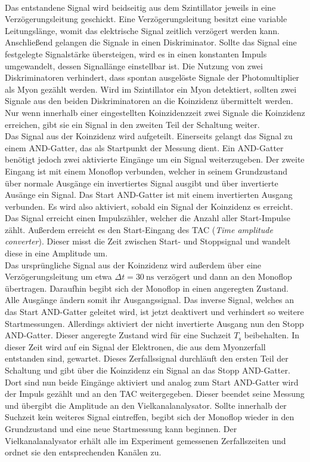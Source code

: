 \\
Das entstandene Signal wird beidseitig aus dem Szintillator jeweils in eine Verzögerungsleitung geschickt.
Eine Verzögerungsleitung besitzt eine variable Leitungslänge, womit das elektrische Signal zeitlich verzögert werden kann.
Anschließend gelangen die Signale in einen Diskriminator.
Sollte das Signal eine festgelegte Signalstärke übersteigen, wird es in einen konstanten Impuls umgewandelt, dessen Signallänge einstellbar ist.
Die Nutzung von zwei Diskriminatoren verhindert, dass spontan ausgelöste Signale der Photomultiplier als Myon gezählt werden.
Wird im Szintillator ein Myon detektiert, sollten zwei Signale aus den beiden Diskriminatoren an die Koinzidenz übermittelt werden.
Nur wenn innerhalb einer eingestellten Koinzidenzzeit zwei Signale die Koinzidenz erreichen, gibt sie ein Signal in den zweiten Teil der Schaltung weiter.
\\
Das Signal aus der Koinzidenz wird aufgeteilt.
Einerseits gelangt das Signal zu einem AND-Gatter, das als Startpunkt der Messung dient.
Ein AND-Gatter benötigt jedoch zwei aktivierte Eingänge um ein Signal weiterzugeben.
Der zweite Eingang ist mit einem Monoflop verbunden, welcher in seinem Grundzustand über normale Ausgänge ein invertiertes Signal ausgibt und über invertierte Ausänge ein Signal.
Das Start AND-Gatter ist mit einem invertierten Ausgang verbunden.
Es wird also aktiviert, sobald ein Signal der Koinzidenz es erreicht.
Das Signal erreicht einen Impulszähler, welcher die Anzahl aller Start-Impulse zählt.
Außerdem erreicht es den Start-Eingang des TAC (\textit{Time amplitude converter}).
Dieser misst die Zeit zwischen Start- und Stoppsignal und wandelt diese in eine Amplitude um.
\\
Das ursprüngliche Signal aus der Koinzidenz wird außerdem über eine Verzögerungsleitung um etwa $\Delta t = \qty{30}{\nano\second}$ verzögert und dann an den Monoflop übertragen.
Daraufhin begibt sich der Monoflop in einen angeregten Zustand. 
Alle Ausgänge ändern somit ihr Ausgangssignal.
Das inverse Signal, welches an das Start AND-Gatter geleitet wird, ist jetzt deaktivert und verhindert so weitere Startmessungen.
Allerdings aktiviert der nicht invertierte Ausgang nun den Stopp AND-Gatter.
Dieser angeregte Zustand wird für eine Suchzeit $T_\text{s}$ beibehalten. 
In dieser Zeit wird auf ein Signal der Elektronen, die aus dem Myonzerfall entstanden sind, gewartet.
Dieses Zerfallssignal durchläuft den ersten Teil der Schaltung und gibt über die Koinzidenz ein Signal an das Stopp AND-Gatter.
Dort sind nun beide Eingänge aktiviert und analog zum Start AND-Gatter wird der Impuls gezählt und an den TAC weitergegeben.
Dieser beendet seine Messung und übergibt die Amplitude an den Vielkanalanalysator.
Sollte innerhalb der Suchzeit kein weiteres Signal eintreffen, begibt sich der Monoflop wieder in den Grundzustand und eine neue Startmessung kann beginnen.
Der Vielkanalanalysator erhält alle im Experiment gemessenen Zerfallszeiten und ordnet sie den entsprechenden Kanälen zu.
